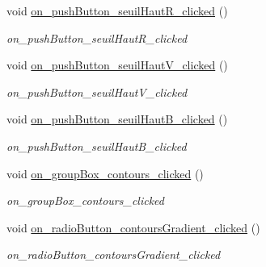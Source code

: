 \begin{DoxyCompactItemize}
\mbox{\label{classMainWindow_a0955f000872ed7a2b3d8e14f4de65f15}} 
void \hyperlink{classMainWindow_a0955f000872ed7a2b3d8e14f4de65f15}{on\+\_\+push\+Button\+\_\+seuil\+Haut\+R\+\_\+clicked} ()
\begin{DoxyCompactList}\small\item\em on\+\_\+push\+Button\+\_\+seuil\+Haut\+R\+\_\+clicked \end{DoxyCompactList}\item 
\mbox{\label{classMainWindow_a330bc9f755ba342c39bb8473154307a4}} 
void \hyperlink{classMainWindow_a330bc9f755ba342c39bb8473154307a4}{on\+\_\+push\+Button\+\_\+seuil\+Haut\+V\+\_\+clicked} ()
\begin{DoxyCompactList}\small\item\em on\+\_\+push\+Button\+\_\+seuil\+Haut\+V\+\_\+clicked \end{DoxyCompactList}\item 
\mbox{\label{classMainWindow_a0f1550fb16b2b9f9f167d357b0ac6210}} 
void \hyperlink{classMainWindow_a0f1550fb16b2b9f9f167d357b0ac6210}{on\+\_\+push\+Button\+\_\+seuil\+Haut\+B\+\_\+clicked} ()
\begin{DoxyCompactList}\small\item\em on\+\_\+push\+Button\+\_\+seuil\+Haut\+B\+\_\+clicked \end{DoxyCompactList}\item 
\mbox{\label{classMainWindow_a6a2703678a7578bc5a8644408266c202}} 
void \hyperlink{classMainWindow_a6a2703678a7578bc5a8644408266c202}{on\+\_\+group\+Box\+\_\+contours\+\_\+clicked} ()
\begin{DoxyCompactList}\small\item\em on\+\_\+group\+Box\+\_\+contours\+\_\+clicked \end{DoxyCompactList}\item 
\mbox{\label{classMainWindow_ac94c3ca9b44aaf147ca376d3a88b6ab2}} 
void \hyperlink{classMainWindow_ac94c3ca9b44aaf147ca376d3a88b6ab2}{on\+\_\+radio\+Button\+\_\+contours\+Gradient\+\_\+clicked} ()
\begin{DoxyCompactList}\small\item\em on\+\_\+radio\+Button\+\_\+contours\+Gradient\+\_\+clicked \end{DoxyCompactList}\item 

\end{DoxyCompactItemize}
